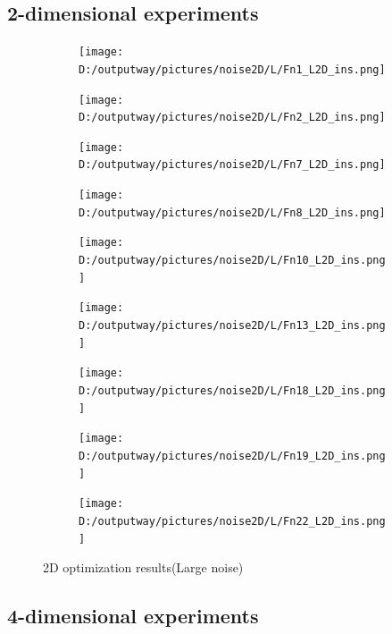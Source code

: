 \documentclass{article}
\begin{document}
\subsection{2-dimensional experiments}
\begin{figure}[H]
    \centering
    \begin{subfigure}[t]{.32\linewidth}
        \centering
        \texttt{[image: D:/outputway/pictures/noise2D/L/Fn1\_L2D\_ins.png]}
    \end{subfigure}
    \begin{subfigure}[t]{.32\linewidth}
        \centering
        \texttt{[image: D:/outputway/pictures/noise2D/L/Fn2\_L2D\_ins.png]}
    \end{subfigure}
    \begin{subfigure}[t]{.32\linewidth}
        \centering
        \texttt{[image: D:/outputway/pictures/noise2D/L/Fn7\_L2D\_ins.png]}
    \end{subfigure}
    \begin{subfigure}[t]{.32\linewidth}
        \centering
        \texttt{[image: D:/outputway/pictures/noise2D/L/Fn8\_L2D\_ins.png]}
    \end{subfigure}
    \begin{subfigure}[t]{.32\linewidth}
        \centering
        \texttt{[image: D:/outputway/pictures/noise2D/L/Fn10\_L2D\_ins.png]}
    \end{subfigure}
    \begin{subfigure}[t]{.32\linewidth}
        \centering
        \texttt{[image: D:/outputway/pictures/noise2D/L/Fn13\_L2D\_ins.png]}
    \end{subfigure}
    \begin{subfigure}[t]{.32\linewidth}
        \centering
        \texttt{[image: D:/outputway/pictures/noise2D/L/Fn18\_L2D\_ins.png]}
    \end{subfigure}
    \begin{subfigure}[t]{.32\linewidth}
        \centering
        \texttt{[image: D:/outputway/pictures/noise2D/L/Fn19\_L2D\_ins.png]}
    \end{subfigure}
    \begin{subfigure}[t]{.32\linewidth}
        \centering
        \texttt{[image: D:/outputway/pictures/noise2D/L/Fn22\_L2D\_ins.png]}
    \end{subfigure}
    \caption{2D optimization results(Large noise)}
    \label{Fig7}
\end{figure}

\subsection{4-dimensional experiments}
\end{document}

